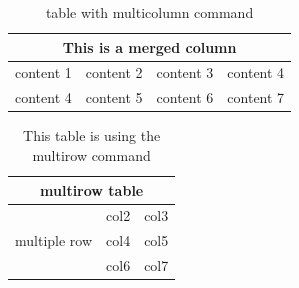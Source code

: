     \begin{table}[h]
        \begin{tabular}{ |p{3cm} | p{3cm} | p{3cm} | p{3cm}| }
            \hline
            \multicolumn{4}{|c|}{This is a merged column} \\
            \hline 
            content 1 & content 2 & content 3 & content 4 \\
            content 4 & content 5 & content 6 & content 7 \\
            \hline
    
        \end{tabular}
        \caption{ table with multicolumn command}
        \label{table:table_multicolumn}        
    \end{table}

    \begin{table}[h]
        \centering
        \begin{tabular}{|c|c|c|}
            \hline
            \multicolumn{3}{|c|}{multirow table} \\
            \hline
            \multirow{3}{5em}{multiple row} & col2 & col3 \\ 
                                            & col4 & col5 \\
                                            & col6 & col7 \\
            \hline
        \end{tabular}
        \caption{This table is using the multirow command}
        \label{table:table_multirow}
    \end{table}

